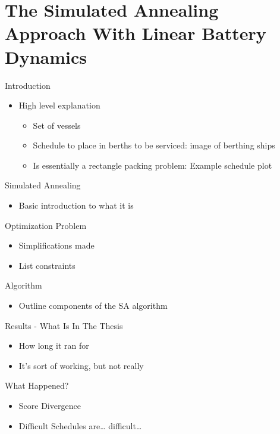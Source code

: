 \documentclass[bigger]{beamer}
\begin{document}
\section{The Simulated Annealing Approach With Linear Battery Dynamics}
\label{sec:orgd0a0107}
\begin{frame}[label={sec:orgdbf2fc6}]{Introduction}
\begin{itemize}
\item High level explanation
\begin{itemize}
\item Set of vessels
\item Schedule to place in berths to be serviced: image of berthing ships
\item Is essentially a rectangle packing problem: Example schedule plot
\end{itemize}
\end{itemize}
\end{frame}
\begin{frame}[label={sec:org103c036}]{Simulated Annealing}
\begin{itemize}
\item Basic introduction to what it is
\end{itemize}
\end{frame}
\begin{frame}[label={sec:orgdba6a68}]{Optimization Problem}
\begin{itemize}
\item Simplifications made
\item List constraints
\end{itemize}
\end{frame}
\begin{frame}[label={sec:org2f30f7a}]{Algorithm}
\begin{itemize}
\item Outline components of the SA algorithm
\end{itemize}
\end{frame}
\begin{frame}[label={sec:org4d68c59}]{Results - What Is In The Thesis}
\begin{itemize}
\item How long it ran for
\item It's sort of working, but not really
\end{itemize}
\end{frame}
\begin{frame}[label={sec:orgd23a45a}]{What Happened?}
\begin{itemize}
\item Score Divergence
\item Difficult Schedules are\ldots{} difficult\ldots{}
\end{itemize}
\end{frame}
\end{document}
